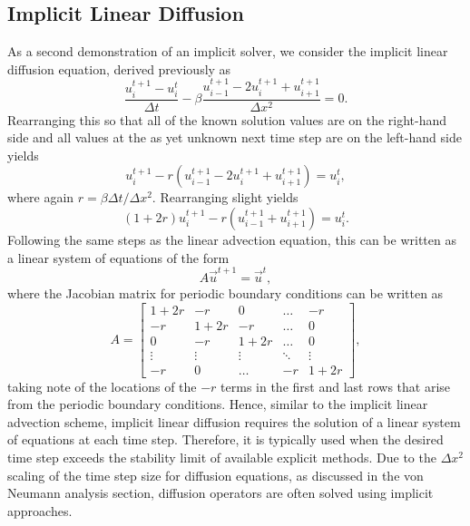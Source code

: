 \subsection{Implicit Linear Diffusion}
As a second demonstration of an implicit solver, we consider the implicit linear diffusion equation, derived previously as
\begin{equation}
  \frac{u_i^{t+1} - u_{i}^t}{\Delta t} - \beta \frac{u_{i-1}^{t+1} - 2u_i^{t+1} + u_{i+1}^{t+1}}{\Delta x^2} = 0.
\end{equation}
Rearranging this so that all of the known solution values are on the right-hand side and all values at the as yet unknown next time step are on the left-hand side yields
\begin{equation}
  u_i^{t+1} - r (u_{i-1}^{t+1} - 2u_i^{t+1} + u_{i+1}^{t+1}) = u_{i}^t,
\end{equation}
where again $r = \beta \Delta t / \Delta x^2$. Rearranging slight yields
\begin{equation}
  (1+2r)u_i^{t+1} - r (u_{i-1}^{t+1} + u_{i+1}^{t+1}) = u_{i}^t.
\end{equation}
Following the same steps as the linear advection equation, this can be written as a linear system of equations of the form
\begin{equation}
	A \vec{u}^{t+1} = \vec{u}^{t},
\end{equation}
where the Jacobian matrix for periodic boundary conditions can be written as
\begin{equation}
	A = 
	\begin{bmatrix}
	    1+2r & -r & 0 & \dots  & -r \\
	    -r & 1+2r & -r & \dots  & 0 \\
			0 & -r & 1+2r & \dots  & 0 \\
	    \vdots & \vdots & \vdots & \ddots & \vdots \\
	    -r & 0 & \dots & -r & 1+2r
	\end{bmatrix},
\end{equation}
taking note of the locations of the $-r$ terms in the first and last rows that arise from the periodic boundary conditions. Hence, similar to the implicit linear advection scheme, implicit linear diffusion requires the solution of a linear system of equations at each time step. Therefore, it is typically used when the desired time step exceeds the stability limit of available explicit methods. Due to the $\Delta x^2$ scaling of the time step size for diffusion equations, as discussed in the von Neumann analysis section, diffusion operators are often solved using implicit approaches.

